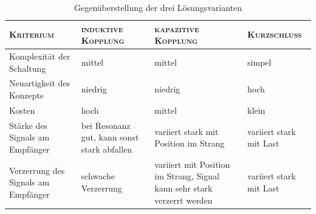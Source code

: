 \begin{table}[h!tb]
    \centering
    \small
    \caption{Gegen\"uberstellung der drei L\"osungsvarianten}
    \label{tab:simu:conclusion}
    \begin{tabular}{p{38mm}p{28mm}p{28mm}p{28mm}}
        \toprule
        \textsc{Kriterium} &
        \parbox[t]{27mm}{\textsc{induktive\\Kopplung}} &
        \parbox[t]{27mm}{\textsc{kapazitive\\Kopplung}} &
        \textsc{Kurzschluss} \\

        \midrule

        Komplexit\"at der Schaltung &
        mittel &
        mittel &
        simpel \\
        [7mm]

        Neuartigkeit des Konzepts &
        niedrig &
        niedrig &
        hoch \\
        [7mm]

        Kosten &
        hoch &
        mittel &
        klein  \\
        [7mm]

        St\"arke des Signals am Empf\"anger &
        bei Resonanz gut, kann sonst stark abfallen &
        variiert stark mit Position im Strang &
        variiert stark mit Last \\
        [7mm]

        Verzerrung des Signals am Empf\"anger &
        schwache Verzerrung &
        variiert mit Position im Strang, Signal kann sehr stark verzerrt werden &
        variiert stark mit Last \\
        \bottomrule
    \end{tabular}
\end{table}
